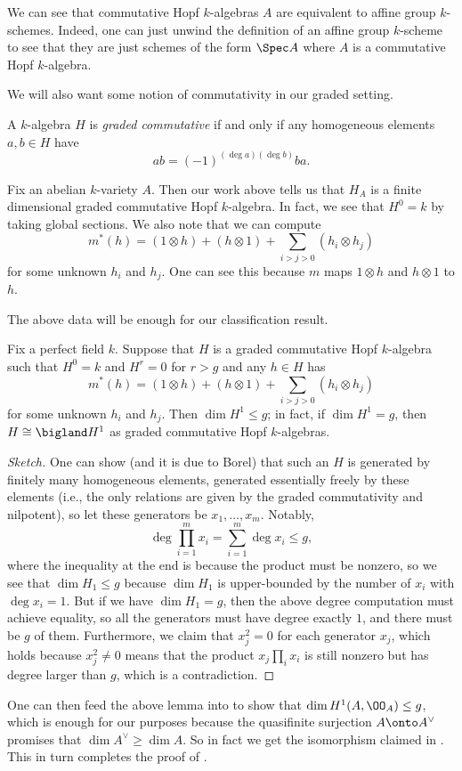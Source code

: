 \documentclass[../notes.tex]{subfiles}
\begin{document}
\begin{remark}
	We can see that commutative Hopf $k$-algebras $A$ are equivalent to affine group $k$-sche\-mes. Indeed, one can just unwind the definition of an affine group $k$-scheme to see that they are just schemes of the form $\Spec A$ where $A$ is a commutative Hopf $k$-algebra.
\end{remark}
We will also want some notion of commutativity in our graded setting.
\begin{definition}
	A $k$-algebra $H$ is \textit{graded commutative} if and only if any homogeneous elements $a,b\in H$ have
	\[ab=(-1)^{(\deg a)(\deg b)}ba.\]
\end{definition}
\begin{example}
	Fix an abelian $k$-variety $A$. Then our work above tells us that $H_A$ is a finite dimensional graded commutative Hopf $k$-algebra. In fact, we see that $H^0=k$ by taking global sections. We also note that we can compute
	\[m^*(h)=(1\otimes h)+(h\otimes 1)+\sum_{i>j>0}(h_i\otimes h_j)\]
	for some unknown $h_i$ and $h_j$. One can see this because $m$ maps $1\otimes h$ and $h\otimes1$ to $h$.
\end{example}
The above data will be enough for our classification result.
\begin{lemma}
	Fix a perfect field $k$. Suppose that $H$ is a graded commutative Hopf $k$-algebra such that $H^0=k$ and $H^r=0$ for $r>g$ and any $h\in H$ has
	\[m^*(h)=(1\otimes h)+(h\otimes 1)+\sum_{i>j>0}(h_i\otimes h_j)\]
	for some unknown $h_i$ and $h_j$. Then $\dim H^1\le g$; in fact, if $\dim H^1=g$, then $H\cong\bigland H^1$ as graded commutative Hopf $k$-algebras.
\end{lemma}
\begin{proof}[Sketch]
	One can show (and it is due to Borel) that such an $H$ is generated by finitely many homogeneous elements, generated essentially freely by these elements (i.e., the only relations are given by the graded commutativity and nilpotent), so let these generators be $x_1,\ldots,x_m$. Notably,
	\[\deg\prod_{i=1}^mx_i=\sum_{i=1}^m\deg x_i\le g,\]
	where the inequality at the end is because the product must be nonzero, so we see that $\dim H_1\le g$ because $\dim H_1$ is upper-bounded by the number of $x_i$ with $\deg x_i=1$. But if we have $\dim H_1=g$, then the above degree computation must achieve equality, so all the generators must have degree exactly $1$, and there must be $g$ of them. Furthermore, we claim that $x_j^2=0$ for each generator $x_j$, which holds because $x_j^2\ne0$ means that the product $x_j\prod_ix_i$ is still nonzero but has degree larger than $g$, which is a contradiction.
\end{proof}
One can then feed the above lemma into  to show that $\dim H^1(A,\OO_A)\le g$, which is enough for our purposes because the quasifinite surjection $A\onto A^\lor$ promises that $\dim A^\lor\ge\dim A$. So in fact we get the isomorphism claimed in . This in turn completes the proof of .
\end{document}
